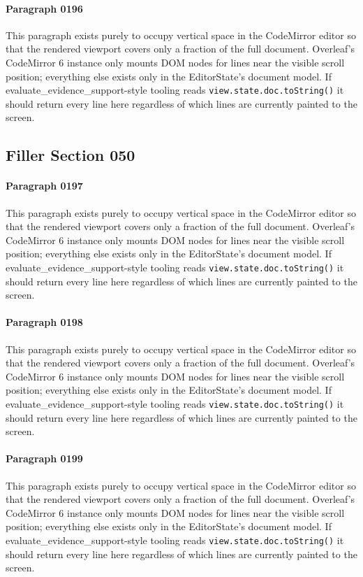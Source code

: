 \documentclass{article}
\begin{document}
\paragraph{Paragraph 0196}
This paragraph exists purely to occupy vertical space in the CodeMirror editor so that the rendered viewport covers only a fraction of the full document. Overleaf's CodeMirror 6 instance only mounts DOM nodes for lines near the visible scroll position; everything else exists only in the EditorState's document model. If evaluate\_evidence\_support-style tooling reads \texttt{view.state.doc.toString()} it should return every line here regardless of which lines are currently painted to the screen.

\subsection{Filler Section 050}
\paragraph{Paragraph 0197}
This paragraph exists purely to occupy vertical space in the CodeMirror editor so that the rendered viewport covers only a fraction of the full document. Overleaf's CodeMirror 6 instance only mounts DOM nodes for lines near the visible scroll position; everything else exists only in the EditorState's document model. If evaluate\_evidence\_support-style tooling reads \texttt{view.state.doc.toString()} it should return every line here regardless of which lines are currently painted to the screen.

\paragraph{Paragraph 0198}
This paragraph exists purely to occupy vertical space in the CodeMirror editor so that the rendered viewport covers only a fraction of the full document. Overleaf's CodeMirror 6 instance only mounts DOM nodes for lines near the visible scroll position; everything else exists only in the EditorState's document model. If evaluate\_evidence\_support-style tooling reads \texttt{view.state.doc.toString()} it should return every line here regardless of which lines are currently painted to the screen.

\paragraph{Paragraph 0199}
This paragraph exists purely to occupy vertical space in the CodeMirror editor so that the rendered viewport covers only a fraction of the full document. Overleaf's CodeMirror 6 instance only mounts DOM nodes for lines near the visible scroll position; everything else exists only in the EditorState's document model. If evaluate\_evidence\_support-style tooling reads \texttt{view.state.doc.toString()} it should return every line here regardless of which lines are currently painted to the screen.
\end{document}

